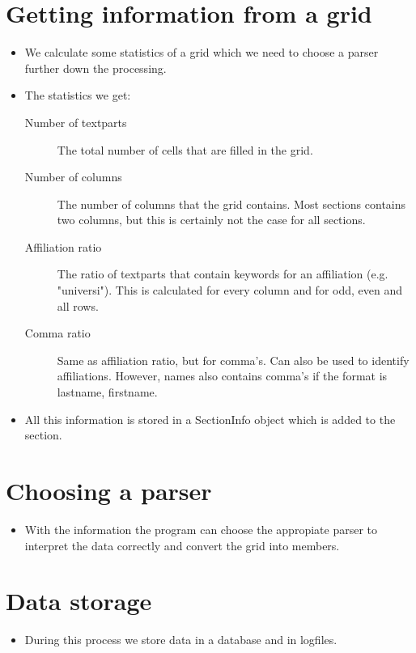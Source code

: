 \documentclass{ou-report}
\begin{document}
\section{Getting information from a grid}
\begin{itemize}
    \item We calculate some statistics of a grid which we need to choose a
        parser further down the processing.
    \item The statistics we get:
    \begin{description}
        \item[Number of textparts] The total number of cells that are filled in
            the grid.
        \item[Number of columns] The number of columns that the grid contains.
            Most sections contains two columns, but this is certainly not the 
            case for all sections.
        \item[Affiliation ratio] The ratio of textparts that contain keywords 
            for an affiliation (e.g. "universi"). This is calculated for every 
            column and for odd, even and all rows.
        \item[Comma ratio] Same as affiliation ratio, but for comma's. Can also
            be used to identify affiliations. However, names also contains 
            comma's if the format is lastname, firstname.
    \end{description}
    \item All this information is stored in a SectionInfo object which is added
        to the section.
\end{itemize}

\section{Choosing a parser}
\begin{itemize}
    \item With the information the program can choose the appropiate parser to
        interpret the data correctly and convert the grid into members.
\end{itemize}

\section{Data storage}
\begin{itemize}
    \item During this process we store data in a database and in logfiles.
\end{itemize}
\end{document}

